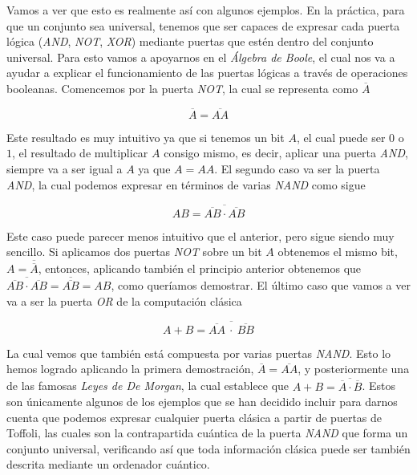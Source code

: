 \documentclass[12pt]{article}
\numberwithin{equation}{section} %
\begin{document}
    \vspace{5mm}
    
    Vamos a ver que esto es realmente así con algunos ejemplos. En la práctica, para que un conjunto sea universal, tenemos que ser capaces de expresar cada puerta lógica (\textit{AND}, \textit{NOT}, \textit{XOR}) mediante puertas que estén dentro del conjunto universal. Para esto vamos a apoyarnos en el \textit{Álgebra de Boole}, el cual nos va a ayudar a explicar el funcionamiento de las puertas lógicas a través de operaciones booleanas. Comencemos por la puerta \textit{NOT}, la cual se representa como \( \overline{\textit{A}} \)

    \begin{equation*}
        \overline{A} = \overline{A A}
    \end{equation*}

    \vspace{2.5mm}

    Este resultado es muy intuitivo ya que si tenemos un bit \( A \), el cual puede ser \( 0 \) o \( 1 \), el resultado de multiplicar \( A \) consigo mismo, es decir, aplicar una puerta \textit{AND}, siempre va a ser igual a \( A \) ya que \( A = AA \). El segundo caso va ser la puerta \textit{AND}, la cual podemos expresar en términos de varias \textit{NAND} como sigue

    \begin{equation*}
        A B = \overline{ \overline{A B} \cdot \overline{A B} }
    \end{equation*}

    \vspace{2.5mm}

    Este caso puede parecer menos intuitivo que el anterior, pero sigue siendo muy sencillo. Si aplicamos dos puertas \textit{NOT} sobre un bit \( A \) obtenemos el mismo bit, \( A = \overline{\overline{A}}\), entonces, aplicando también el principio anterior obtenemos que \( \overline{ \overline{A B} \cdot \overline{A B} } = \overline{\overline{A B}} = AB \), como queríamos demostrar. El último caso que vamos a ver va a ser la puerta \textit{OR} de la computación clásica

    \begin{equation*}
        A + B =  \overline{ \overline{A A} \ \cdot \ \overline{B B} }
    \end{equation*}

    \vspace{2.5mm}

    La cual vemos que también está compuesta por varias puertas \textit{NAND}. Esto lo hemos logrado aplicando la primera demostración, \( \overline{A} = \overline{A A} \), y posteriormente una de las famosas \textit{Leyes de De Morgan}, la cual establece que \( A + B = \overline{\overline{A} \cdot \overline{B}} \). Estos son únicamente algunos de los ejemplos que se han decidido incluir para darnos cuenta que podemos expresar cualquier puerta clásica a partir de puertas de Toffoli, las cuales son la contrapartida cuántica de la puerta \textit{NAND} que forma un conjunto universal, verificando así que toda información clásica puede ser también descrita mediante un ordenador cuántico.
\end{document}
